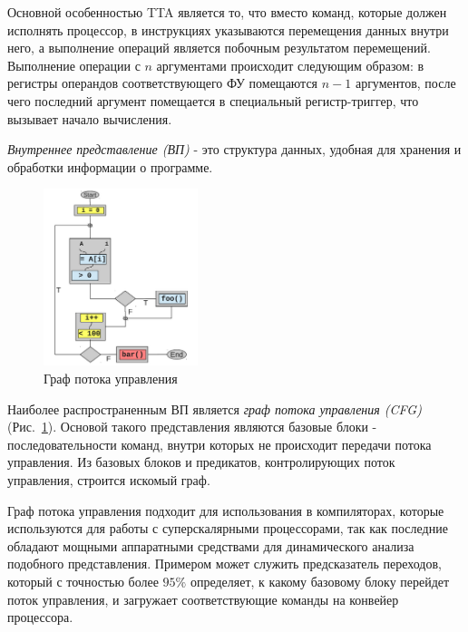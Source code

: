 \documentclass{matmex-diploma-custom}
\begin{document}
Основной особенностью TTA является то, что вместо команд, которые должен исполнять процессор, в инструкциях указываются перемещения данных внутри него, а выполнение операций является побочным результатом перемещений. Выполнение операции с $n$ аргументами происходит следующим образом: в регистры операндов соответствующего ФУ помещаются $n - 1$ аргументов, после чего последний аргумент помещается в специальный регистр-триггер, что вызывает начало вычисления.

\textit{Внутреннее представление (ВП)} - это структура данных, удобная для хранения и обработки информации о программе.

\begin{figure}
    \vspace{-30pt}
    \begin{center}
        \includegraphics[width=0.4\textwidth]{cfg.png}
    \end{center}
    \vspace{-20pt}
    \caption{Граф потока управления \cite{vsfg}}
    \vspace{-10pt}
    \label{cfg}
\end{figure}

Наиболее распространенным ВП является \textit{граф потока управления (CFG)} (Рис.~\ref{cfg}). 
Основой такого представления являются базовые блоки - последовательности команд, внутри которых не происходит передачи потока управления. Из базовых блоков и предикатов, контролирующих поток управления, строится искомый граф.

Граф потока управления подходит для использования в компиляторах, которые используются для работы с суперскалярными процессорами, так как последние обладают мощными аппаратными средствами для динамического анализа подобного представления. Примером может служить предсказатель переходов, который с точностью более $95\%$ \cite{vsfg} определяет, к какому базовому блоку перейдет поток управления, и загружает соответствующие команды на конвейер процессора.
\end{document}
